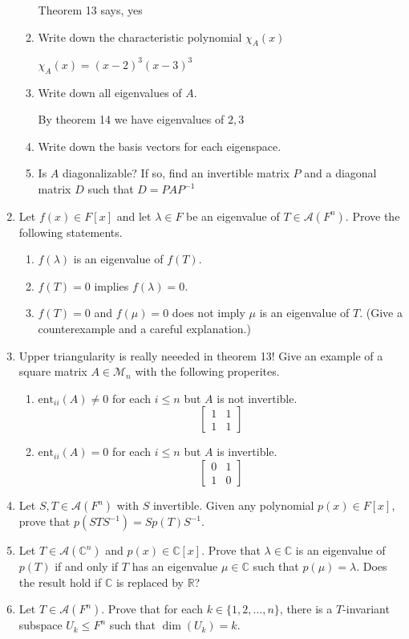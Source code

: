 \documentclass[letterpaper]{article}
\begin{document}
\begin{enumerate}
\begin{enumerate}
  Theorem 13 says, yes
  \item
  Write down the characteristic polynomial $\chi_A(x)$

  $\chi_A(x)=(x-2)^3(x-3)^3$
  \item
  Write down all eigenvalues of $A$.

  By theorem 14 we have eigenvalues of $2,3$
  \item
  Write down the basis vectors for each eigenspace.
  \item
  Is $A$ diagonalizable? If so, find an invertible matrix $P$ and a diagonal matrix $D$ such that $D=PAP^{-1}$
  \end{enumerate}
\item
Let $f(x)\in F[x]$ and let $\lambda\in F$ be an eigenvalue of $T\in \mathcal{A}(F^n)$. Prove the following statements.
  \begin{enumerate}
  \item
  $f(\lambda)$ is an eigenvalue of $f(T)$.
  \item
  $f(T)=0$ implies $f(\lambda)=0$.
  \item
  $f(T)=0$ and $f(\mu)=0$ does not imply $\mu$ is an eigenvalue of $T$. (Give a counterexample and a careful explanation.)
  \end{enumerate}
\item
Upper triangularity is really neeeded in theorem 13! Give an example of a square matrix $A\in \mathcal{M}_n$ with the following properites.
  \begin{enumerate}
  \item
  $\text{ent}_{ii}(A)\ne0$ for each $i\le n$ but $A$ is not invertible.
  \[\left[\begin{array}{cc}1&1\\1&1\end{array}\right]\]
  \item
  $\text{ent}_{ii}(A)=0$ for each $i\le n$ but $A$ is invertible.
  \[\left[\begin{array}{cc}0&1\\1&0\end{array}\right]\]
  \end{enumerate}
\item
Let $S,T\in \mathcal{A}(F^n)$ with $S$ invertible. Given any polynomial $p(x)\in F[x]$, prove that $p(STS^{-1})=Sp(T)S^{-1}$.
\item
Let $T\in \mathcal{A}(\mathbb{C}^n)$ and $p(x)\in \mathbb{C}[x]$. Prove that $\lambda\in \mathbb{C}$ is an eigenvalue of $p(T)$ if and only if $T$ has an eigenvalue $\mu\in \mathbb{C}$ such that $p(\mu)=\lambda$. Does the result hold if $\mathbb{C}$ is replaced by $\mathbb{R}$?
\item
Let $T\in \mathcal{A}(F^n)$. Prove that for each $k\in \{1,2,\dots,n\}$, there is a $T$-invariant subspace $U_k\le F^n$ such that $\dim(U_k)=k$.
\end{enumerate}
\end{document}
